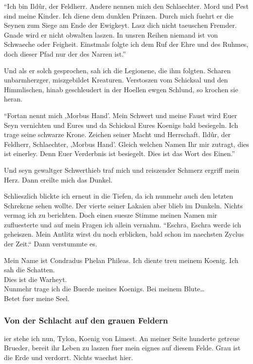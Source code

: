 \documentclass[a5paper,8pt]{book}
\begin{document}
``Ich bin Ildûr, der Feldherr. Andere nennen mich den Schlaechter. Mord und Pest sind meine Kinder. Ich diene dem dunklen Prinzen. Durch mich fuehrt er die Seynen zum Siege am Ende der Ewigkeyt. Lasz dich nicht taeuschen Fremder. Gnade wird er nicht obwalten laszen. In unsren Reihen niemand ist von Schwaeche oder Feigheit. Einstmals folgte ich dem Ruf der Ehre und des Ruhmes, doch dieser Pfad nur der des Narren ist.''

Und als er solch gesprochen, sah ich die Legionene, die ihm folgten. Scharen unbarmherzger, miszgebildet Kreaturen. Verstoszen vom Schicksal und den Himmlischen, hinab geschleudert in der Hoellen ewgen Schlund, so krochen sie heran.

``Fortan nennt mich ‚Morbus Hand’. Mein Schwert und meine Faust wird Euer Seyn vernichten und Eures und da Schicksal Eures Koenigs bald besiegeln. Ich trage seine schwarze Krone. Zeichen seiner Macht und Herrschaft. Ildûr, der Feldherr, Schlaechter, ‚Morbus Hand’.
Gleich welchen Namen Ihr mir zutragt, dies ist einerley. Denn Euer Verderbnis ist besiegelt. Dies ist das Wort des Einen.''

Und seyn gewaltger Schwerthieb traf mich und reiszender Schmerz ergriff mein Herz. Dann ereilte mich das Dunkel.

Schlieszlich blickte ich erneut in die Tiefen, da ich nunmehr auch den letzten Schrekcne sehen wollte. Der vierte seiner Lakaien aber blieb im Dunkeln. Nichts vermag ich zu berichten. Doch einen suesze Stimme meinen Namen mir zufluesterte und auf mein Fragen ich allein vernahm.
``Eschra, Eschra werde ich geheiszen. Mein Antlitz wirst du noch erblicken, bald schon im naechsten Zyclus der Zeit.`` Dann verstummte es. 


Mein Name ist Condradus Phelan Phileas. Ich diente treu meinem Koenig. Ich sah die Schatten. \\

Dies ist die Warheyt.\\

Nunmehr trage ich die Buerde meines Koenigs. Bei meinem Blute…\\
Betet fuer meine Seel.


\newpage

\subsubsection{ Von der Schlacht auf den grauen Feldern}

ier stehe ich nun, Tylon, Koenig von Limest. An meiner Seite hunderte getreue Brueder, bereit ihr Leben zu laszen fuer mein eignes auf diesem Felde. Grau ist die Erde und verdorrt. Nichts waechst hier.
\end{document}
